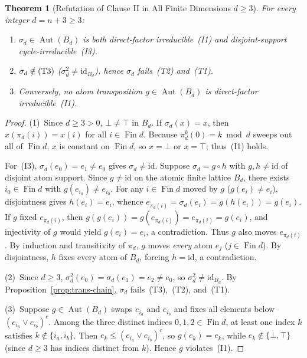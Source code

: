 \documentclass[11pt]{article}
\newtheorem{theorem}{Theorem}[section]
\theoremstyle{definition}
\theoremstyle{remark}
\newcommand{\Aut}{\operatorname{Aut}}
\newcommand{\Fin}{\operatorname{Fin}}
\newcommand{\id}{\mathrm{id}}
\begin{document}
\begin{theorem}[Refutation of Clause II in All Finite Dimensions $d \ge 3$]
\label{thm:finite-refutation}
For every integer $d = n + 3 \ge 3$:
\begin{enumerate}
  \item $\sigma_d \in \Aut(B_d)$ is both direct-factor irreducible~\textup{(I1)} and disjoint-support cycle-irreducible~\textup{(I3)}.
  \item $\sigma_d \notin \text{\textup{(T3)}}$ ($\sigma_d^2 \neq \id_{B_d}$), hence $\sigma_d$ fails~\textup{(T2)} and~\textup{(T1)}.
  \item Conversely, \emph{no} atom transposition $g \in \Aut(B_d)$ is direct-factor irreducible~\textup{(I1)}.
\end{enumerate}
\end{theorem}
\begin{proof}
(1)~Since $d \ge 3 > 0$, $\bot \neq \top$ in $B_d$. If $\sigma_d(x) = x$, then $x(\pi_d(i)) = x(i)$ for all $i \in \Fin d$. Because $\pi_d^k(0) = k \bmod d$ sweeps out all of $\Fin d$, $x$ is constant on $\Fin d$, so $x = \bot$ or $x = \top$; thus~(I1) holds.

For~(I3), $\sigma_d(e_0) = e_1 \neq e_0$ gives $\sigma_d \neq \id$. Suppose $\sigma_d = g \circ h$ with $g, h \neq \id$ of disjoint atom support. Since $g \neq \id$ on the atomic finite lattice $B_d$, there exists $i_0 \in \Fin d$ with $g(e_{i_0}) \neq e_{i_0}$. For any $i \in \Fin d$ moved by $g$ ($g(e_i) \neq e_i$), disjointness gives $h(e_i) = e_i$, whence $e_{\pi_d(i)} = \sigma_d(e_i) = g(h(e_i)) = g(e_i)$. If $g$ fixed $e_{\pi_d(i)}$, then $g(g(e_i)) = g(e_{\pi_d(i)}) = e_{\pi_d(i)} = g(e_i)$, and injectivity of $g$ would yield $g(e_i) = e_i$, a contradiction. Thus $g$ also moves $e_{\pi_d(i)}$. By induction and transitivity of $\pi_d$, $g$ moves \emph{every} atom $e_j$ ($j \in \Fin d$). By disjointness, $h$ fixes every atom of $B_d$, forcing $h = \id$, a contradiction.

(2)~Since $d \ge 3$, $\sigma_d^2(e_0) = \sigma_d(e_1) = e_2 \neq e_0$, so $\sigma_d^2 \neq \id_{B_d}$. By Proposition~\ref{prop:trans-chain}, $\sigma_d$ fails~(T3),~(T2), and~(T1).

(3)~Suppose $g \in \Aut(B_d)$ swaps $e_{i_a}$ and $e_{i_b}$ and fixes all elements below $(e_{i_a} \vee e_{i_b})^c$. Among the three distinct indices $0, 1, 2 \in \Fin d$, at least one index $k$ satisfies $k \notin \{i_a, i_b\}$. Then $e_k \le (e_{i_a} \vee e_{i_b})^c$, so $g(e_k) = e_k$, while $e_k \notin \{\bot, \top\}$ (since $d \ge 3$ has indices distinct from $k$). Hence $g$ violates~(I1).
\end{proof}
\end{document}
